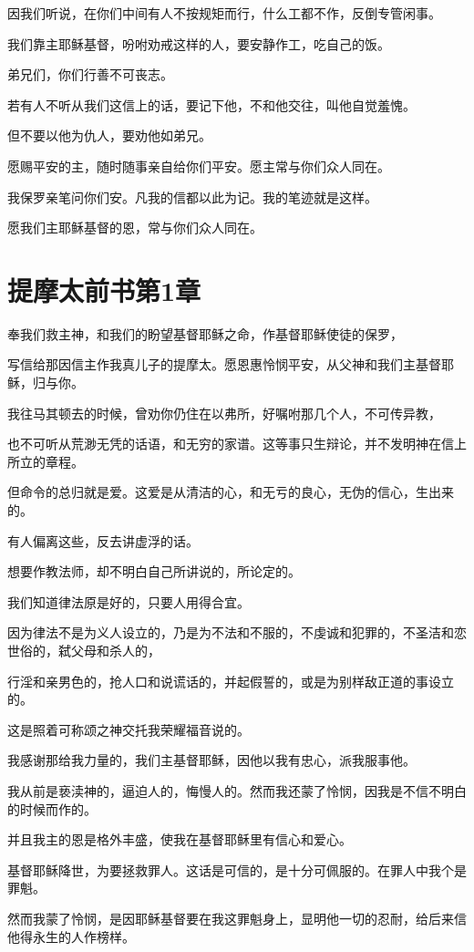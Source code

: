 \documentclass[12pt,oneside]{book}
\begin{document}
因我们听说，在你们中间有人不按规矩而行，什么工都不作，反倒专管闲事。

我们靠主耶稣基督，吩咐劝戒这样的人，要安静作工，吃自己的饭。

弟兄们，你们行善不可丧志。

若有人不听从我们这信上的话，要记下他，不和他交往，叫他自觉羞愧。

但不要以他为仇人，要劝他如弟兄。

愿赐平安的主，随时随事亲自给你们平安。愿主常与你们众人同在。

我保罗亲笔问你们安。凡我的信都以此为记。我的笔迹就是这样。

愿我们主耶稣基督的恩，常与你们众人同在。

\chapter{提摩太前书第1章}
奉我们救主神，和我们的盼望基督耶稣之命，作基督耶稣使徒的保罗，

写信给那因信主作我真儿子的提摩太。愿恩惠怜悯平安，从父神和我们主基督耶稣，归与你。

我往马其顿去的时候，曾劝你仍住在以弗所，好嘱咐那几个人，不可传异教，

也不可听从荒渺无凭的话语，和无穷的家谱。这等事只生辩论，并不发明神在信上所立的章程。

但命令的总归就是爱。这爱是从清洁的心，和无亏的良心，无伪的信心，生出来的。

有人偏离这些，反去讲虚浮的话。

想要作教法师，却不明白自己所讲说的，所论定的。

我们知道律法原是好的，只要人用得合宜。

因为律法不是为义人设立的，乃是为不法和不服的，不虔诚和犯罪的，不圣洁和恋世俗的，弑父母和杀人的，

行淫和亲男色的，抢人口和说谎话的，并起假誓的，或是为别样敌正道的事设立的。

这是照着可称颂之神交托我荣耀福音说的。

我感谢那给我力量的，我们主基督耶稣，因他以我有忠心，派我服事他。

我从前是亵渎神的，逼迫人的，悔慢人的。然而我还蒙了怜悯，因我是不信不明白的时候而作的。

并且我主的恩是格外丰盛，使我在基督耶稣里有信心和爱心。

基督耶稣降世，为要拯救罪人。这话是可信的，是十分可佩服的。在罪人中我个是罪魁。

然而我蒙了怜悯，是因耶稣基督要在我这罪魁身上，显明他一切的忍耐，给后来信他得永生的人作榜样。
\end{document}
